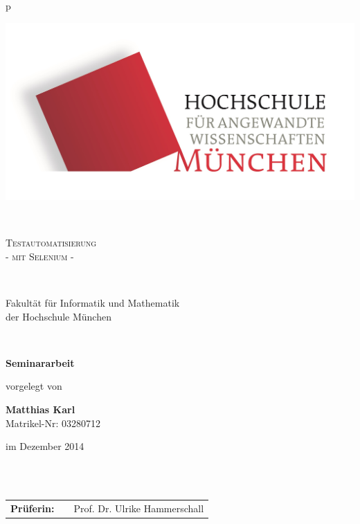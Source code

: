 \begin{center}
\begin{tabular}{p{\textwidth}}


\begin{center}
\includegraphics[scale=0.17]{img/logos.jpg}
\end{center}


\\

\begin{center}
\LARGE{\textsc{
Testautomatisierung \\  \large{- mit Selenium -}
}}
\end{center}

\\


\begin{center}
\large{Fakultät für Informatik und Mathematik \\
der Hochschule München \\}
\end{center}

\\

\begin{center}
\textbf{\Large{Seminararbeit}}
\end{center}



\begin{center}
vorgelegt von
\end{center}

\begin{center}
\large{\textbf{Matthias Karl}} \\
\large{Matrikel-Nr: 03280712} \\
\end{center}

\begin{center}
\large{im Dezember 2014}
\end{center}

\\

\\

\begin{center}
\begin{tabular}{lll}
\textbf{Prüferin:} & & Prof. Dr. Ulrike Hammerschall\\
\end{tabular}
\end{center}

\end{tabular}
\end{center}